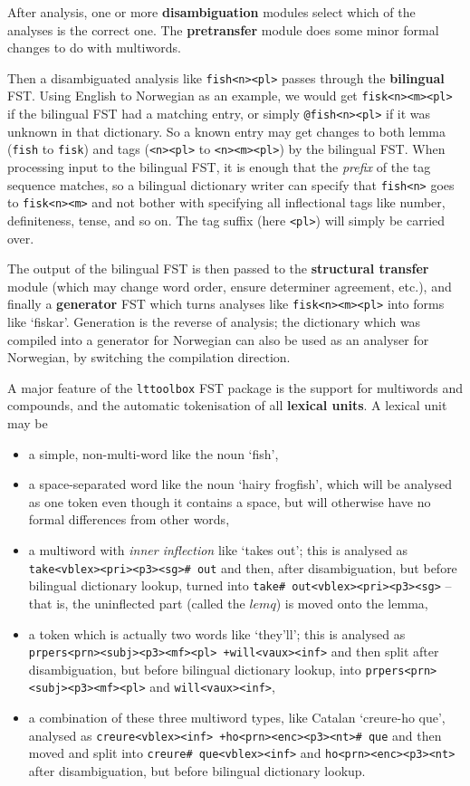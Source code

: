 \documentclass[10pt, a4paper]{article}
\newcommand{\ana}[1]{\texttt{#1}}
\newcommand{\f}[1]{`#1'}
\newcommand{\tool}[1]{\texttt{#1}}
\begin{document}
After analysis, one or more \textbf{disambiguation} modules select
which of the analyses is the correct one. The \textbf{pretransfer}
module does some minor formal changes to do with multiwords.

Then a disambiguated analysis like \ana{fish<n><pl>} passes through
the \textbf{bilingual} FST. Using English to Norwegian as an example,
we would get \ana{fisk<n><m><pl>} if the bilingual FST had a matching
entry, or simply \ana{@fish<n><pl>} if it was unknown in that
dictionary. So a known entry may get changes to both lemma (\ana{fish}
to \ana{fisk}) and tags (\ana{<n><pl>} to \ana{<n><m><pl>}) by the
bilingual FST. When processing input to the bilingual FST, it is
enough that the \emph{prefix} of the tag sequence matches, so a
bilingual dictionary writer can specify that \ana{fish<n>} goes to
\ana{fisk<n><m>} and not bother with specifying all inflectional tags
like number, definiteness, tense, and so on. The tag suffix (here
\ana{<pl>}) will simply be carried over.

The output of the bilingual FST is then passed to the
\textbf{structural transfer} module (which may change word order,
ensure determiner agreement, etc.), and finally a \textbf{generator}
FST which turns analyses like \ana{fisk<n><m><pl>} into forms like
\f{fiskar}. Generation is the reverse of analysis; the dictionary
which was compiled into a generator for Norwegian can also be used as
an analyser for Norwegian, by switching the compilation direction.

A major feature of the \tool{lttoolbox} FST package is the support
for multiwords and compounds, and the automatic tokenisation of all
\textbf{lexical units}. A lexical unit may be
\begin{itemize}
\item a simple, non-multi-word like the noun \f{fish},
\item a space-separated word like the noun \f{hairy frogfish}, which
  will be analysed as one token even though it contains a space, but
  will otherwise have no formal
  differences from other words,
\item a multiword with \emph{inner inflection} like \f{takes out}; this is
  analysed as \ana{take<vblex><pri><p3><sg>\# out} and then, after
  disambiguation, but before bilingual dictionary lookup, turned into
  \ana{take\# out<vblex><pri><p3><sg>} -- that is, the uninflected part
  (called the $lemq$) is moved onto the lemma,
\item a token which is actually two words like \f{they'll}; this is
  analysed as \ana{prpers<prn><subj><p3><mf><pl> +will<vaux><inf>} and
  then split after disambiguation, but before bilingual dictionary
  lookup, into \ana{prpers<prn><subj><p3><mf><pl>} and
  \ana{will<vaux><inf>},
\item a combination of these three multiword types, like Catalan
  \f{creure-ho que}, analysed as \ana{creure<vblex><inf>
    +ho<prn><enc><p3><nt>\# que} and then moved and split into
  \ana{creure\# que<vblex><inf>} and \ana{ho<prn><enc><p3><nt>} after
  disambiguation, but before bilingual dictionary lookup.
\end{itemize}
\end{document}
